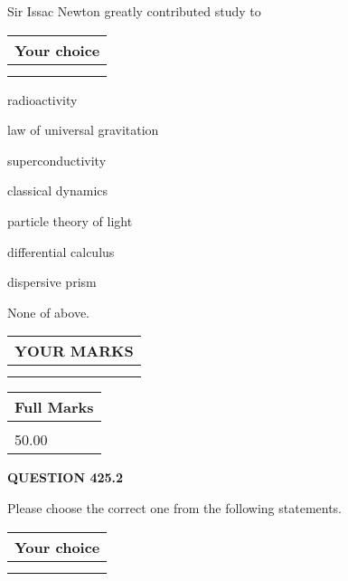 \documentclass[12pt]{article}
\begin{document}
  
Sir Issac Newton greatly contributed study to
  
  
\noindent\hspace{3.0in} \begin{tabular}{|l|}
\hline
Your choice \\
\hline
 \\ 
 \\ 
\hline
\end{tabular}
  
  
 
 
radioactivity
 
 
law of universal gravitation
 
 
superconductivity
 
 
classical dynamics
 
 
particle theory of light
 
 
differential calculus
 
 
dispersive prism
 
 
 None of above.
 
 
  
\vspace{0.2in}
  
\noindent\begin{tabular}{|l|}
\hline
 YOUR MARKS  \\
\hline
 \\ 
 \\ 
\hline
\end{tabular}
\hspace{0.05in} \begin{tabular}{|l|}
\hline
 Full Marks  \\
\hline
 \\ 
50.00 \\
\hline
\end{tabular}
{\textbf{\Large{QUESTION
425.2 
}}}
  
  
Please choose the correct one from the following statements.
  
  
\noindent\hspace{3.0in} \begin{tabular}{|l|}
\hline
Your choice \\
\hline
 \\ 
 \\ 
\hline
\end{tabular}
  
\end{document}
